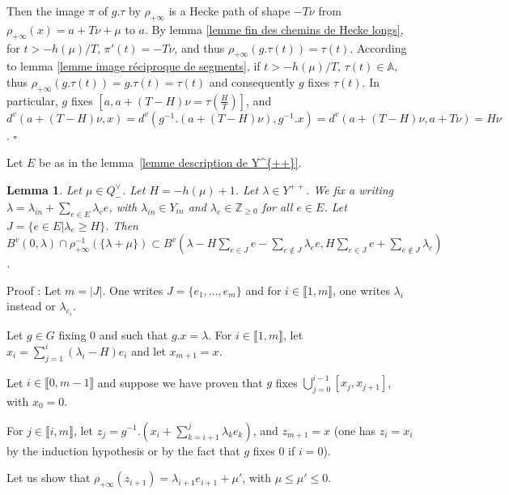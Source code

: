 \documentclass[12pt]{article}
\theoremstyle{plain}
\newtheorem{lemme}[thm]{Lemma}
\theoremstyle{definition}
\begin{document}
Then the image $\pi$ of $g.\tau$ by $\rho_{+\infty}$ is a Hecke path of shape $-T\nu$ from $\rho_{+\infty}(x)=a+T\nu +\mu$ to $a$. By lemma \ref{lemme fin des chemins de Hecke longs}, for $t>-h(\mu)/T$, $\pi'(t)=-T\nu$, and thus $\rho_{+\infty}(g.\tau(t))=\tau(t)$. According to lemma \ref{lemme image réciproque de segments}, if $t>-h(\mu)/T$, $\tau(t)\in \mathbb{A}$, thus $\rho_{+\infty}(g.\tau(t))=g.\tau(t)=\tau(t)$ and consequently $g$ fixes  $\tau(t)$. In particular, $g$ fixes $[a,a+(T-H)\nu=\tau(\frac{H}{T})]$, and $d^v(a+(T-H)\nu,x)=d^v(g^{-1}.(a+(T-H)\nu),g^{-1}.x)=d^v(a+(T-H)\nu,a+T\nu)=H\nu$. $\square$











\vspace{5mm}

Let $E$ be as in the lemma~\ref{lemme description de Y^{++}}. 
 
\begin{lemme}\label{lemme majoration du cardinal des boules}
 Let $\mu \in Q^\vee_-$. Let $H=-h(\mu)+1$. Let $\lambda\in Y^{++}$. We fix a writing  $\lambda=\lambda_{in}+\sum_{e\in E}\lambda_e e$, with $\lambda_{in}\in Y_{in}$ and $\lambda_e\in \mathbb{Z}_{\geq 0}$ for all $e\in E$. Let $J=\{e\in E | \lambda_e \geq H\}$. Then $B^v(0,\lambda)\cap \rho_{+\infty}^{-1}(\{\lambda+\mu\})\subset B^v(\lambda-H\sum_{e\in J} e-\sum_{e\notin J}\lambda_e e, H\sum_{e\in J}e+\sum_{e\notin J}\lambda_ e)$. 
\end{lemme}
 
Proof : Let $m=|J|$. One writes $J=\{e_1,\ldots,e_m\}$ and for $i\in \llbracket 1,m\rrbracket$, one writes $\lambda_i$ instead or $\lambda_{e_i}$.
 
Let $g\in G$ fixing $0$ and such that $g.x=\lambda$. For $i\in \llbracket 1,m\rrbracket$, let $x_i=\sum_{j=1}^i (\lambda_i-H)e_i$ and let $x_{m+1}=x$.
 
Let $i\in \llbracket 0,m-1\rrbracket$ and suppose we have proven that $g$ fixes $\bigcup_{j=0}^{i-1}[x_j,x_{j+1}]$, with $x_0=0$.
 
 
For $j\in\llbracket i,m\rrbracket$, let $z_j=g^{-1}.(x_{i}+\sum_{k=i+1}^j \lambda_k e_k)$, and $z_{m+1}=x$ (one has $z_i=x_i$ by the induction hypothesis or by the fact that $g$ fixes $0$ if $i=0$).

Let us show that $\rho_{+\infty}(z_{i+1})=\lambda_{i+1}e_{i+1}+\mu'$, with $\mu\leq \mu' \leq 0$.
\end{document}
